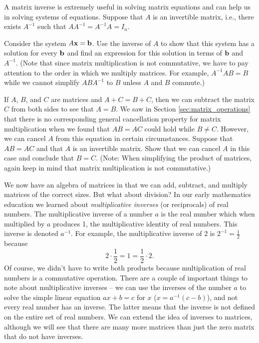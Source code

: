 \begin{pa}
\begin{enumerate}[i.]
		\end{enumerate}
	\ea

\item A matrix inverse is extremely useful in solving matrix equations and can help us in solving systems of equations. Suppose that $A$ is an invertible matrix, i.e., there exists $A^{-1}$ such that $AA^{-1}=A^{-1}A=I_n$.

\ba 

\item Consider the system $A\mathbf{x}=\mathbf{b}$. Use the inverse of $A$ to show that this system has a solution for every $\mathbf{b}$ and find an expression for this solution in terms of $\mathbf{b}$ and $A^{-1}$. (Note that since matrix multiplication is not commutative, we have to pay attention to the order in which we multiply matrices. For example, $A^{-1}AB=B$ while we cannot simplify $ABA^{-1}$ to $B$ unless $A$ and $B$ commute.)

\item If $A$, $B$, and $C$ are matrices and $A+C = B+C$, then we can subtract the matrix $C$ from both sides to see that $A = B$. We saw in Section \ref{sec:matrix_operations} that there is no corresponding general cancellation property for matrix multiplication when we found that $AB=AC$ could hold while $B\neq C$. However, we can cancel $A$ from this equation in certain circumstances. Suppose that $AB=AC$ and that $A$ is an invertible matrix. Show that we can cancel $A$ in this case and conclude that $B=C$. (Note: When simplifying the product of matrices, again keep in mind that matrix multiplication is not commutative.)

\ea

\ee

\end{pa}



We now have an algebra of matrices in that we can add, subtract, and multiply matrices of the correct sizes. But what about division? In our early mathematics education we learned about \emph{multiplicative inverses} (or reciprocals) of real numbers. The multiplicative inverse of a number $a$ is the real number which when multiplied by $a$ produces 1, the multiplicative identity of real numbers. This inverse is denoted $a^{-1}$. For example, the multiplicative inverse of $2$ is $2^{-1}=\frac{1}{2}$ because 
\[2\cdot \frac{1}{2} = 1 = \frac{1}{2}\cdot 2.\]
Of course, we didn't have to write both products because multiplication of real numbers is a commutative operation.  There are a couple of important things to note about multiplicative inverses -- we can use the inverses of the number $a$ to solve the simple linear equation $ax+b = c$ for $x$ ($x = a^{-1}(c-b)$), and not every real number has an inverse. The latter means that the inverse is not defined on the entire set of real numbers. We can extend the idea of inverses to matrices, although we will see that there are many more matrices than just the zero matrix that do not have inverses.

